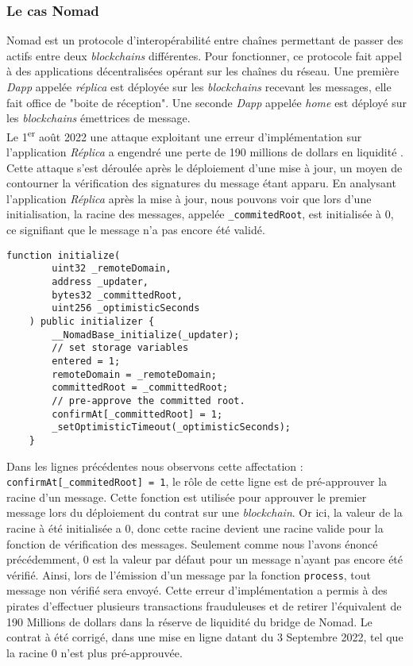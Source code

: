 \subsubsection{Le cas Nomad}
Nomad est un protocole d'interopérabilité entre chaînes permettant de passer des actifs entre deux \textit{blockchains} différentes. 
Pour fonctionner, ce protocole fait appel à des applications décentralisées opérant sur les chaînes du réseau. 
Une première \textit{Dapp} appelée \textit{réplica} est déployée sur les \textit{blockchains} recevant les messages, elle fait office de "boite de réception". 
Une seconde \textit{Dapp} appelée \textit{home} est déployé sur les \textit{blockchains} émettrices de message. \\
Le 1\textsuperscript{er} août 2022 une attaque exploitant une erreur d'implémentation sur l'application \textit{Réplica} a engendré une perte de 190 millions de dollars en liquidité \cite{NomadMedium} \cite{NomadRekt}.
Cette attaque s'est déroulée après le déploiement d'une mise à jour, un moyen de contourner la vérification des signatures du message étant apparu. 
En analysant l'application \textit{Réplica} après la mise à jour, nous pouvons voir que lors d'une initialisation, la racine des messages, appelée \texttt{\_commitedRoot}, est initialisée à $0$, ce signifiant que le message n'a pas encore été validé. 
\begin{lstlisting}[caption={Fonction \textit{initialize} de \textit{Réplica} contenant une erreur \cite{NomadGitError}}]
    function initialize(
        uint32 _remoteDomain,
        address _updater,
        bytes32 _committedRoot,
        uint256 _optimisticSeconds
    ) public initializer {
        __NomadBase_initialize(_updater);
        // set storage variables
        entered = 1;
        remoteDomain = _remoteDomain;
        committedRoot = _committedRoot;
        // pre-approve the committed root.
        confirmAt[_committedRoot] = 1;
        _setOptimisticTimeout(_optimisticSeconds);
    }
\end{lstlisting}

Dans les lignes précédentes nous observons cette affectation : \texttt{confirmAt[\_commitedRoot] = 1}, le rôle de cette ligne est de pré-approuver la racine d'un message. 
Cette fonction est utilisée pour approuver le premier message lors du déploiement du contrat sur une \textit{blockchain}. 
Or ici, la valeur de la racine à été initialisée a $0$, donc cette racine devient une racine valide pour la fonction de vérification des messages. 
Seulement comme nous l'avons énoncé précédemment, $0$ est la valeur par défaut pour un message n'ayant pas encore été vérifié. 
Ainsi, lors de l'émission d'un message par la fonction \texttt{process}, tout message non vérifié sera envoyé. 
Cette erreur d'implémentation a permis à des pirates d'effectuer plusieurs transactions frauduleuses et de retirer l'équivalent de 190 Millions de dollars dans la réserve de liquidité du bridge de Nomad. 
Le contrat à été corrigé, dans une mise en ligne datant du 3 Septembre 2022, tel que la racine $0$ n'est plus pré-approuvée. 


